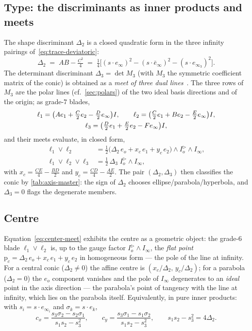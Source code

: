 \documentclass{birkjour}
\theoremstyle{definition}
\theoremstyle{remark}
\newcommand{\eo}{e_o}
\newcommand{\einf}{e_\infty}
\newcommand{\einfbar}{\bar e_\infty}
\newcommand{\Iod}{I_o^{\triangleright}}      %
\newcommand{\Iinf}{I_\infty}
\newcommand{\meet}{\vee}
\newcommand{\joinp}{\wedge}
\begin{document}
\subsection{Type: the discriminants as inner products and meets}
\label{sec:discriminants}
The shape discriminant $\Delta_2$ is a closed quadratic form in the three
infinity pairings of~\eqref{eq:trace-deviatoric}:
\begin{equation}\label{eq:delta2}
  \Delta_2 \;=\; AB-\tfrac{C^2}{4}
  \;=\; \tfrac14\Big[(s\!\cdot\einf)^2-(s\!\cdot\einfbar)^2-(s\!\cdot e_{\infty_3})^2\Big].
\end{equation}
The determinant discriminant $\Delta_3=\det M_3$ (with $M_3$ the symmetric
coefficient matrix of the conic) is obtained as a \emph{meet of three dual
lines}~\cite{chomicki_intersection_2023}. The three rows of $M_3$ are the
polar lines (cf.~\cref{sec:polars}) of the two ideal basis directions and of
the origin; as grade-$7$ blades,
\begin{gather}
  \ell_1=\big(A e_1+\tfrac C2 e_2-\tfrac D2 \einf\big) I,\qquad
  \ell_2=\big(\tfrac C2 e_1+B e_2-\tfrac E2 \einf\big) I,\notag\\
  \ell_3=\big(\tfrac D2 e_1+\tfrac E2 e_2-F \einf\big) I,
  \label{eq:three-lines}
\end{gather}
and their meets evaluate, in closed form,
\begin{align}
  \ell_1\meet\ell_2
  &= \tfrac12\big(\Delta_2\,\eo + x_c\,e_1 + y_c\,e_2\big)\joinp\Iod\joinp\Iinf,
  \label{eq:center-meet}\\
  \ell_1\meet\ell_2\meet\ell_3
  &= \tfrac12\,\Delta_3\;\Iod\joinp\Iinf,
  \label{eq:delta3-meet}
\end{align}
with $x_c = \tfrac{CE}4-\tfrac{BD}2$ and $y_c=\tfrac{CD}4-\tfrac{AE}2$. The
pair $(\Delta_2,\Delta_3)$ then classifies the conic by
\cref{tab:axis-master}: the sign of $\Delta_2$ chooses
ellipse/parabola/hyperbola, and $\Delta_3=0$ flags the degenerate members.

\subsection{Centre}
\label{sec:center}
Equation~\eqref{eq:center-meet} exhibits the centre as a geometric object: the
grade-$6$ blade $\ell_1\meet\ell_2$ is, up to the gauge factor
$\Iod\joinp\Iinf$, the \emph{flat point}
$\mathrm{p}_c = \Delta_2\,\eo + x_c\,e_1+y_c\,e_2$ in homogeneous form ---
the pole of the line at infinity. For a central conic ($\Delta_2\neq0$) the
affine centre is $(x_c/\Delta_2,\,y_c/\Delta_2)$; for a parabola
($\Delta_2=0$) the $\eo$ component vanishes and the pole of $\Iinf$
degenerates to an \emph{ideal} point in the axis direction --- the parabola's
point of tangency with the line at infinity, which lies on the parabola
itself. Equivalently, in pure inner products: with
$s_i = s\!\cdot e_{\infty_i}$ and $\sigma_k = s\!\cdot e_k$,
\begin{equation}\label{eq:center-ip}
  c_x=\frac{s_3\sigma_2-s_2\sigma_1}{s_1 s_2-s_3^2},\qquad
  c_y=\frac{s_3\sigma_1-s_1\sigma_2}{s_1 s_2-s_3^2},\qquad
  s_1 s_2 - s_3^2 = 4\Delta_2 .
\end{equation}
\end{document}
